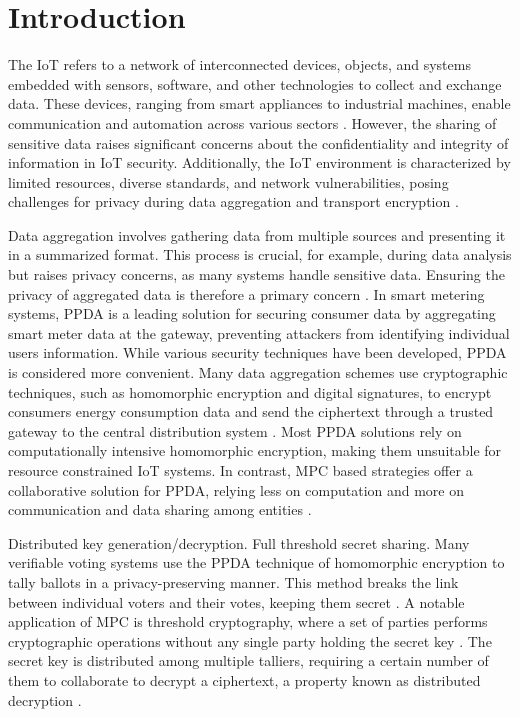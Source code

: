 \chapter{Introduction}
The \ac{IoT} refers to a network of interconnected devices, objects, and systems embedded with sensors, software, and other technologies to collect and exchange data. These devices, ranging from smart appliances to industrial machines, enable communication and automation across various sectors \cite[1]{combinatorial}. However, the sharing of sensitive data raises significant concerns about the confidentiality and integrity of information in \ac{IoT} security. Additionally, the \ac{IoT} environment is characterized by limited resources, diverse standards, and network vulnerabilities, posing challenges for privacy during data aggregation and transport encryption \cite[1]{smpc}.

Data aggregation involves gathering data from multiple sources and presenting it in a summarized format. This process is crucial, for example, during data analysis but raises privacy concerns, as many systems handle sensitive data. Ensuring the privacy of aggregated data is therefore a primary concern \cite[2]{ppda-fog}. In smart metering systems, \ac{PPDA} is a leading solution for securing consumer data by aggregating smart meter data at the gateway, preventing attackers from identifying individual users information. While various security techniques have been developed, \ac{PPDA} is considered more convenient. Many data aggregation schemes use cryptographic techniques, such as homomorphic encryption and digital signatures, to encrypt consumers energy consumption data and send the ciphertext through a trusted gateway to the central distribution system \cite[113-114]{smart-meter}. Most \ac{PPDA} solutions rely on computationally intensive homomorphic encryption, making them unsuitable for resource constrained \ac{IoT} systems. In contrast, \ac{MPC} based strategies offer a collaborative solution for \ac{PPDA}, relying less on computation and more on communication and data sharing among entities \cite[1]{mpc}.

Distributed key generation/decryption. Full threshold secret sharing.
Many verifiable voting systems use the \ac{PPDA} technique of homomorphic encryption to tally ballots in a privacy-preserving manner. This method breaks the link between individual voters and their votes, keeping them secret \cite[53]{stuve-study}. A notable application of \ac{MPC} is threshold cryptography, where a set of parties performs cryptographic operations without any single party holding the secret key \cite[3]{mpc-ing}. The secret key is distributed among multiple talliers, requiring a certain number of them to collaborate to decrypt a ciphertext, a property known as distributed decryption \cite[40]{stuve-study}.



